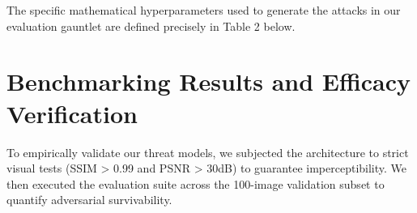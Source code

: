 \documentclass[12pt, a4paper]{article}
\begin{document}
The specific mathematical hyperparameters used to generate the attacks in our evaluation gauntlet are defined precisely in Table 2 below.

\newpage
\section{Benchmarking Results and Efficacy Verification}

To empirically validate our threat models, we subjected the architecture to strict visual tests (SSIM > 0.99 and PSNR > 30dB) to guarantee imperceptibility. We then executed the evaluation suite across the 100-image validation subset to quantify adversarial survivability.

\begin{table}[H]
    \centering
    \caption{Hyperparameter matrices utilized for comparative benchmark evaluations.}
\end{table}
\end{document}
